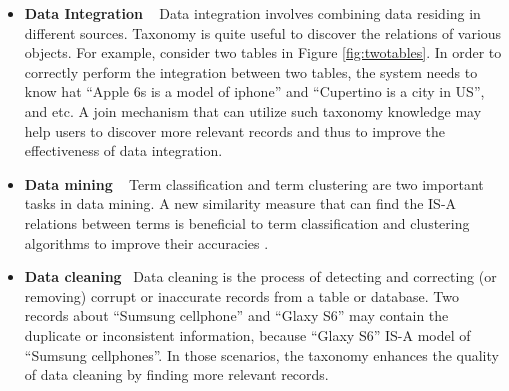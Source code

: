 \begin{itemize}
  \item \textbf{Data Integration} ~ Data integration involves combining data residing in different sources. Taxonomy is quite useful to  discover the relations of various objects. For example, consider two tables in Figure \ref{fig:twotables}. In order to correctly perform the integration between two tables, the system needs to know hat ``\textsf{Apple 6s is a model of iphone}'' and ``\textsf{Cupertino is a city in US}'', and etc. A join mechanism that can utilize such taxonomy knowledge may help users to discover more relevant records and thus to improve the effectiveness of data integration.
  \item \textbf{Data mining} ~ Term classification and term clustering are two important tasks in data mining. A new similarity measure that can find the IS-A relations between terms is beneficial to term classification and clustering algorithms to improve their accuracies \cite{journals/dke/CaglieroG13}.
  \item \textbf{Data cleaning}~  Data cleaning is the process of detecting and correcting (or removing) corrupt or inaccurate records from a table or database. Two records about ``\textsf{Sumsung cellphone}'' and ``\textsf{Glaxy S6}'' may contain the duplicate or inconsistent information, because ``\textsf{Glaxy S6}'' IS-A model of ``\textsf{Sumsung cellphones}''. In those scenarios, the taxonomy enhances the quality of data cleaning by finding more relevant records.

\end{itemize}






